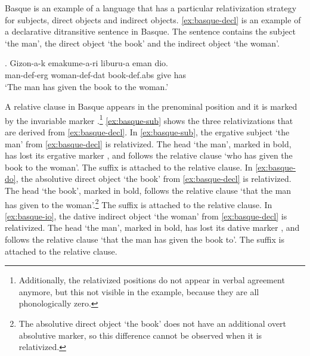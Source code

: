 Basque is an example of a language that has a particular relativization strategy for subjects, direct objects and indirect objects. \ref{ex:basque-decl} is an example of a declarative ditransitive sentence in Basque. The sentence contains the subject  `the man', the direct object  `the book' and the indirect object  `the woman'.

\exg. Gizon-a-k emakume-a-ri liburu-a eman dio.\\
 man-\ac{def}-\ac{erg} woman-\ac{def}-\ac{dat} book-\ac{def}.\ac{abs} give has\\
 `The man has given the book to the woman.' \label{ex:basque-decl}

A relative clause in Basque appears in the prenominal position and it is marked by the invariable marker .\footnote{
Additionally, the relativized positions do not appear in verbal agreement anymore, but this not visible in the example, because they are all phonologically zero.
}
\ref{ex:basque-sub} shows the three relativizations that are derived from \ref{ex:basque-decl}.
In \ref{ex:basque-sub}, the ergative subject  `the man' from \ref{ex:basque-decl} is relativized. The head  `the man', marked in bold, has lost its ergative marker , and follows the relative clause  `who has given the book to the woman'. The suffix  is attached to the relative clause.
In \ref{ex:basque-do}, the absolutive direct object  `the book' from \ref{ex:basque-decl} is relativized. The head  `the book', marked in bold, follows the relative clause  `that the man has given to the woman'.\footnote{
The absolutive direct object  `the book' does not have an additional overt absolutive marker, so this difference cannot be observed when it is relativized.
}
The suffix  is attached to the relative clause.
In \ref{ex:basque-io}, the dative indirect object  `the woman' from \ref{ex:basque-decl} is relativized. The head  `the man', marked in bold, has lost its dative marker , and follows the relative clause  `that the man has given the book to'. The suffix  is attached to the relative clause.

